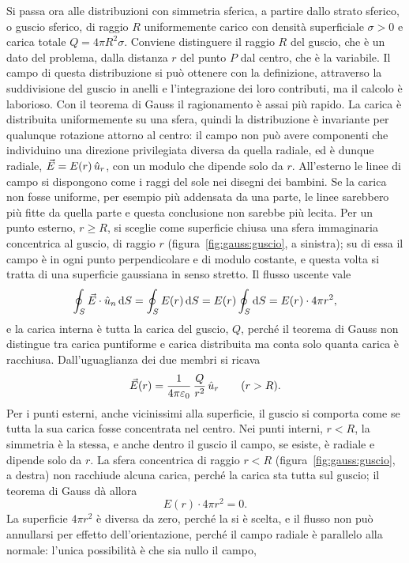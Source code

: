 \documentclass[11pt,a4paper]{article}
\begin{document}
Si passa ora alle distribuzioni con simmetria sferica, a partire dallo strato sferico, o guscio sferico, di raggio $R$ uniformemente carico con densità superficiale $\sigma>0$ e carica totale $Q=4\pi R^2\sigma$. Conviene distinguere il raggio $R$ del guscio, che è un dato del problema, dalla distanza $r$ del punto $P$ dal centro, che è la variabile. Il campo di questa distribuzione si può ottenere con la definizione, attraverso la suddivisione del guscio in anelli e l'integrazione dei loro contributi, ma il calcolo è laborioso. Con il teorema di Gauss il ragionamento è assai più rapido. La carica è distribuita uniformemente su una sfera, quindi la distribuzione è invariante per qualunque rotazione attorno al centro: il campo non può avere componenti che individuino una direzione privilegiata diversa da quella radiale, ed è dunque radiale, $\vec{E}=E(r)\,\hat{u}_r$, con un modulo che dipende solo da $r$. All'esterno le linee di campo si dispongono come i raggi del sole nei disegni dei bambini. Se la carica non fosse uniforme, per esempio più addensata da una parte, le linee sarebbero più fitte da quella parte e questa conclusione non sarebbe più lecita. Per un punto esterno, $r\ge R$, si sceglie come superficie chiusa una sfera immaginaria concentrica al guscio, di raggio $r$ (figura~\ref{fig:gauss:guscio}, a sinistra); su di essa il campo è in ogni punto perpendicolare e di modulo costante, e questa volta si tratta di una superficie gaussiana in senso stretto. Il flusso uscente vale
\[
\oint_S\vec{E}\cdot\hat{u}_n\,\mathrm{d} S=\oint_S E(r)\,\mathrm{d} S=E(r)\oint_S\mathrm{d} S=E(r)\cdot4\pi r^2 ,
\]
e la carica interna è tutta la carica del guscio, $Q$, perché il teorema di Gauss non distingue tra carica puntiforme e carica distribuita ma conta solo quanta carica è racchiusa. Dall'uguaglianza dei due membri si ricava
\begin{equation}
\vec{E}(r)=\frac{1}{4\pi\varepsilon_0}\,\frac{Q}{r^2}\,\hat{u}_r\qquad(r>R).
\label{eq:gauss:gusciofuori}
\end{equation}
Per i punti esterni, anche vicinissimi alla superficie, il guscio si comporta come se tutta la sua carica fosse concentrata nel centro. Nei punti interni, $r<R$, la simmetria è la stessa, e anche dentro il guscio il campo, se esiste, è radiale e dipende solo da $r$. La sfera concentrica di raggio $r<R$ (figura~\ref{fig:gauss:guscio}, a destra) non racchiude alcuna carica, perché la carica sta tutta sul guscio; il teorema di Gauss dà allora
\[
E(r)\cdot4\pi r^2=0 .
\]
La superficie $4\pi r^2$ è diversa da zero, perché la si è scelta, e il flusso non può annullarsi per effetto dell'orientazione, perché il campo radiale è parallelo alla normale: l'unica possibilità è che sia nullo il campo,
\end{document}
